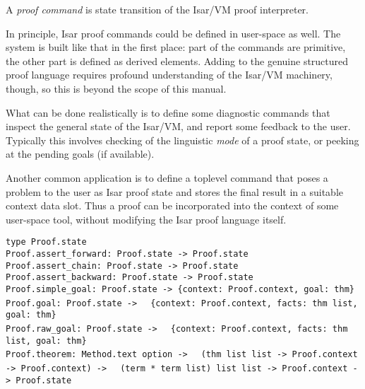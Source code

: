 \begin{isabellebody}
\begin{isamarkuptext}
\begin{enumerate}
  \end{enumerate}%
\end{isamarkuptext}%
\isamarkuptrue%
%
\isamarkuptrue%
%
\begin{isamarkuptext}%
A \emph{proof command} is state transition of the Isar/VM
  proof interpreter.

  In principle, Isar proof commands could be defined in
  user-space as well.  The system is built like that in the first
  place: part of the commands are primitive, the other part is defined
  as derived elements.  Adding to the genuine structured proof
  language requires profound understanding of the Isar/VM machinery,
  though, so this is beyond the scope of this manual.

  What can be done realistically is to define some diagnostic commands
  that inspect the general state of the Isar/VM, and report some
  feedback to the user.  Typically this involves checking of the
  linguistic \emph{mode} of a proof state, or peeking at the pending
  goals (if available).

  Another common application is to define a toplevel command that
  poses a problem to the user as Isar proof state and stores the final
  result in a suitable context data slot.  Thus a proof can be
  incorporated into the context of some user-space tool, without
  modifying the Isar proof language itself.%
\end{isamarkuptext}%
\isamarkuptrue%
%
\isadelimmlref
%
\endisadelimmlref
%
\isatagmlref
%
\begin{isamarkuptext}%
\begin{mldecls}
  \verb|type Proof.state| \\
  \verb|Proof.assert_forward: Proof.state -> Proof.state| \\
  \verb|Proof.assert_chain: Proof.state -> Proof.state| \\
  \verb|Proof.assert_backward: Proof.state -> Proof.state| \\
  \verb|Proof.simple_goal: Proof.state -> {context: Proof.context, goal: thm}| \\
  \verb|Proof.goal: Proof.state ->|\isasep\isanewline%
\verb|  {context: Proof.context, facts: thm list, goal: thm}| \\
  \verb|Proof.raw_goal: Proof.state ->|\isasep\isanewline%
\verb|  {context: Proof.context, facts: thm list, goal: thm}| \\
  \verb|Proof.theorem: Method.text option ->|\isasep\isanewline%
\verb|  (thm list list -> Proof.context -> Proof.context) ->|\isasep\isanewline%
\verb|  (term * term list) list list -> Proof.context -> Proof.state| \\
  \end{mldecls}


\end{isamarkuptext}
\end{isabellebody}
